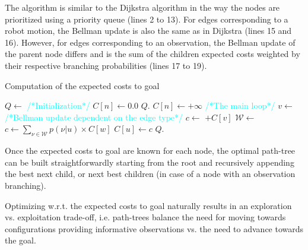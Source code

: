 \documentclass[letterpaper, 10 pt, conference]{ieeeconf}  %
\begin{document}
The algorithm is similar to the Dijkstra algorithm \cite{Sniedovich2006DijkstrasAR} in the way the nodes are prioritized using a priority queue (lines 2 to 13). For edges corresponding to a robot motion, the Bellman update is also the same as in Dijkstra (lines 15 and 16). However, for edges corresponding to an observation, the Bellman update of the parent node differs and is the sum of the children expected costs weighted by their respective branching probabilities (lines 17 to 19).
\begin{algorithm}[H]
\caption{Computation of the expected costs to goal}
\label{alg:expected_costs}
\begin{algorithmic}[1]
	\State $Q \gets $ 
	\State \textcolor{cyan}{\footnotesize/*Initialization*/}
			\State $C[n] \gets 0.0$
			\State $Q$.
		\Else
			\State $C[n] \gets +\infty$
		\EndIf
	\EndFor
	\State \textcolor{cyan}{\footnotesize/*The main loop*/}
		\State $v \gets$ 
			\State \textcolor{cyan}{\footnotesize/*Bellman update dependent on the edge type*/}
				\State $c \gets$ $+ C[v]$
				\State $\mathcal{W} \gets $ 
				\State $c \gets \sum_{\nu \in \mathcal{W}}{ p(\nu | u) \times C[w]} $
			\EndIf
				\State $C[u] \gets c$
				\State $Q$.
			\EndIf
		\EndFor
	\EndWhile
\EndFunction
\end{algorithmic}
\end{algorithm}

Once the expected costs to goal are known for each node, the optimal path-tree can be built straightforwardly starting from the root and recursively appending the best next child, or next best children (in case of a node with an observation branching).

Optimizing w.r.t. the expected costs to goal naturally results in an exploration vs. exploitation trade-off, i.e. path-trees balance the need for moving towards configurations  providing informative observations vs. the need to advance towards the goal.
\end{document}

